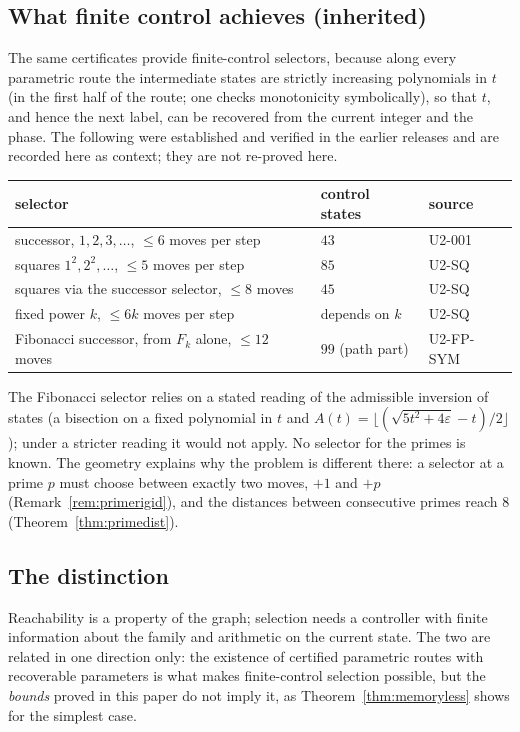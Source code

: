 \subsection{What finite control achieves (inherited)}
The same certificates provide finite-control selectors, because along every parametric route the intermediate states are strictly increasing polynomials in $t$ (in the first half of the route; one checks monotonicity symbolically), so that $t$, and hence the next label, can be recovered from the current integer and the phase. The following were established and verified in the earlier releases and are recorded here as context; they are not re-proved here.
\begin{center}\small
\begin{tabular}{@{}p{}p{}p{}@{}}\toprule
selector & control states & source\\\midrule
successor, $1,2,3,\dots$, $\le6$ moves per step & $43$ & U2-001\\
squares $1^2,2^2,\dots$, $\le5$ moves per step & $85$ & U2-SQ\\
squares via the successor selector, $\le8$ moves & $45$ & U2-SQ\\
fixed power $k$, $\le6k$ moves per step & depends on $k$ & U2-SQ\\
Fibonacci successor, from $F_k$ alone, $\le12$ moves & $99$ (path part) & U2-FP-SYM\\\bottomrule
\end{tabular}
\end{center}
The Fibonacci selector relies on a stated reading of the admissible inversion of states (a bisection on a fixed polynomial in $t$ and $A(t)=\lfloor(\sqrt{5t^2+4\varepsilon}-t)/2\rfloor$); under a stricter reading it would not apply. No selector for the primes is known. The geometry explains why the problem is different there: a selector at a prime $p$ must choose between exactly two moves, $+1$ and $+p$ (Remark~\ref{rem:primerigid}), and the distances between consecutive primes reach $8$ (Theorem~\ref{thm:primedist}).

\subsection{The distinction}
Reachability is a property of the graph; selection needs a controller with finite information about the family and arithmetic on the current state. The two are related in one direction only: the existence of certified parametric routes with recoverable parameters is what makes finite-control selection possible, but the \emph{bounds} proved in this paper do not imply it, as Theorem~\ref{thm:memoryless} shows for the simplest case.


